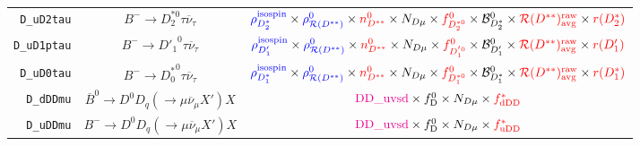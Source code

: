 \begin{landscape}
\begin{table}
\begin{tabular}{r|c|c}
       \texttt{D\_uD2tau} &                 $B^- \rightarrow D_2^{*0} \tau \overline{\nu}_\tau$                  &                        $\textcolor{blue}{\rho^\text{isospin}_{D_2^*}} \times \textcolor{blue}{\rho_{\mathcal{R}(D^{**})}^0} \times \textcolor{red}{n^{0}_{D^{**}}} \times N_{D \mu} \times \textcolor{red}{f^{0}_{D_2^{*0}}} \times \mathcal{B}^{0}_{D_2^*} \times \textcolor{red}{\mathcal{R}(D^{**})_\text{avg}^\text{raw}} \times \textcolor{red}{r({D_2^*})}$                        \\
      \texttt{D\_uD1ptau} &                 $B^- \rightarrow {D'_1}^0 \tau \overline{\nu}_\tau$                  &                         $\textcolor{blue}{\rho^\text{isospin}_{D'_1}} \times \textcolor{blue}{\rho_{\mathcal{R}(D^{**})}^0} \times \textcolor{red}{n^{0}_{D^{**}}} \times N_{D \mu} \times \textcolor{red}{f^{0}_{D_1^{'0}}} \times \mathcal{B}^{0}_{D'_1} \times \textcolor{red}{\mathcal{R}(D^{**})_\text{avg}^\text{raw}} \times \textcolor{red}{r({D'_1})}$                          \\
       \texttt{D\_uD0tau} &                 $B^- \rightarrow {D^*_0}^0 \tau \overline{\nu}_\tau$                 &                        $\textcolor{blue}{\rho^\text{isospin}_{D_1^*}} \times \textcolor{blue}{\rho_{\mathcal{R}(D^{**})}^0} \times \textcolor{red}{n^{0}_{D^{**}}} \times N_{D \mu} \times \textcolor{red}{f^{0}_{D_1^{*0}}} \times \mathcal{B}^{0}_{D_1^*} \times \textcolor{red}{\mathcal{R}(D^{**})_\text{avg}^\text{raw}} \times \textcolor{red}{r({D_1^*})}$                        \\
        \texttt{D\_dDDmu} &    $\overline{B}^0 \rightarrow D^0 D_q (\rightarrow \mu \overline{\nu}_\mu X') X$    &                                                                                                                                  $\textcolor{magenta}{\text{DD\_uvsd}} \times f^{0}_\text{D} \times N_{D \mu} \times \textcolor{red}{f^{*}_\text{dDD}}$                                                                                                                                  \\
        \texttt{D\_uDDmu} &         $B^- \rightarrow D^0 D_q (\rightarrow \mu \overline{\nu}_\mu X') X$          &                                                                                                                                  $\textcolor{magenta}{\text{DD\_uvsd}} \times f^{0}_\text{D} \times N_{D \mu} \times \textcolor{red}{f^{*}_\text{uDD}}$                                                                                                                                  \\

\end{tabular}
\end{table}
\end{landscape}
